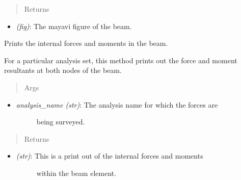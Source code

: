 \documentclass[letterpaper,10pt,english]{sphinxmanual}
\begin{document}
\begin{fulllineitems}
\begin{fulllineitems}
\begin{itemize}
\begin{description}
\end{description}

\end{itemize}
\begin{quote}\begin{description}
\item[{Returns}] \leavevmode
\end{description}\end{quote}
\begin{itemize}
\item {} 
\emph{(fig)}: The mayavi figure of the beam.

\end{itemize}

\end{fulllineitems}


\begin{fulllineitems}
\label{structures:AeroComBAT.Structures.TBeam.printInternalForce}
Prints the internal forces and moments in the beam.

For a particular analysis set, this method prints out the force and
moment resultants at both nodes of the beam.
\begin{quote}\begin{description}
\item[{Args}] \leavevmode
\end{description}\end{quote}
\begin{itemize}
\item {} \begin{description}
\item[{\emph{analysis\_name (str)}: The analysis name for which the forces are}] \leavevmode
being surveyed.

\end{description}

\end{itemize}
\begin{quote}\begin{description}
\item[{Returns}] \leavevmode
\end{description}\end{quote}
\begin{itemize}
\item {} \begin{description}
\item[{\emph{(str)}: This is a print out of the internal forces and moments}] \leavevmode
within the beam element.


\end{description}
\end{itemize}
\end{fulllineitems}
\end{fulllineitems}
\end{document}
